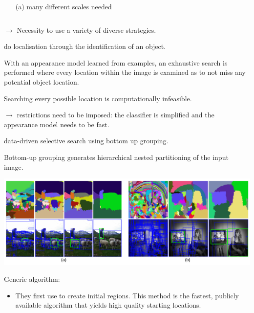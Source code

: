 \begin{frame}[allowframebreaks]
\begin{columns}
\begin{column}{.4\textwidth}
\begin{itemize}
			\item[(a)] many different scales needed
		\end{itemize} 
		
	\end{column}%
\end{columns}

\medskip

$\rightarrow$ Necessity to use a variety of diverse strategies.


	
	\framebreak
	
	 do localisation through the identification of an object.
	
	\bigskip
	
	 With an appearance model learned
	from examples, an exhaustive search is performed where every location
	within the image is examined as to not miss any potential
	object location.
	
	\medskip 
	
		
	Searching every possible location is computationally infeasible.

\medskip

$\rightarrow$ restrictions
	need to be imposed: the classifier is simplified and the appearance
	model needs to be fast.
	
		\bigskip
		
	 data-driven selective search using bottom up grouping.
	
	\framebreak
	
	Bottom-up grouping generates hierarchical nested partitioning of the input image. 
	
	
	\begin{center}
	\includegraphics[scale=0.4]{figs/selective_search_partitions.PNG}
	\end{center}

\framebreak 

Generic algorithm:
\begin{itemize}
	\item They first use \cite{felzenszwalb2004efficient} 
	to create initial regions. This method is the fastest, publicly
	available algorithm that yields high quality starting locations.
	

\end{itemize}
\end{frame}
